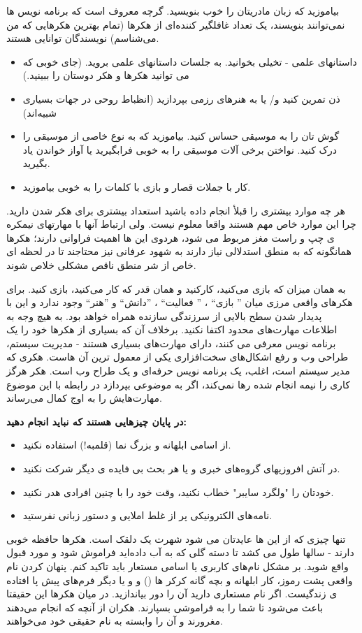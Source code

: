 بیاموزید که زبان مادریتان را خوب بنویسید. گرچه معروف است که برنامه نویس ها نمی‌توانند بنویسند، یک تعداد غافلگیر کننده‌ای از هکرها (تمام بهترین هکرهایی که من می‌شناسم) نویسندگان توانایی هستند.
\begin{itemize}
\item داستانهای علمی - تخیلی بخوانید. به جلسات داستانهای علمی بروید. (جای خوبی که می توانید هکرها و هکر دوستان را ببینید.)
\item ذن تمرین کنید و/ یا به هنرهای رزمی بپردازید (انظباط روحی در جهات بسیاری شبیه‌اند)
\item گوش تان را به موسیقی حساس کنید. بیاموزید که به نوع خاصی از موسیقی را درک کنید. نواختن برخی آلات موسیقی را به خوبی فرابگیرید یا آواز خواندن یاد بگیرید.
\item کار با جملات قصار و بازی با کلمات را به خوبی بیاموزید.
\end{itemize}
هر چه موارد بیشتری را قبلأ انجام داده باشید استعداد بیشتری برای هکر شدن دارید. چرا این موارد خاص مهم هستند واقعا معلوم نیست. ولی ارتباط آنها با مهارتهای نیمکره ی چپ و راست مغز مربوط می شود، هردوی این ها اهمیت فراوانی دارند؛ هکرها همانگونه که به منطق استدلالی نیاز دارند به شهود عرفانی نیز محتاجند تا در لحظه ای خاص از شر منطق ناقص مشکلی خلاص شوند.

به همان میزان که بازی می‌کنید، کارکنید و همان قدر که کار می‌کنید، بازی کنید. برای هکر‌های واقعی مرزی میان ” بازی“ ، ” فعالیت“ ، ”دانش“ و ”هنر“ وجود ندارد و این با پدیدار شدن سطح بالایی از سرزندگی سازنده همراه خواهد بود. به هیچ وجه به اطلاعات مهارت‌های محدود اکتفا نکنید. برخلاف آن که بسیاری از هکرها خود را یک برنامه نویس معرفی می کنند، دارای مهارت‌های بسیاری هستند - مدیریت سیستم، طراحی وب و رفع اشکال‌های سخت‌افزاری 
یکی از معمول ترین آن هاست. هکری که مدیر سیستم است، اغلب، یک برنامه نویس حرفه‌ای و یک طراح وب است. هکر هرگز کاری را نیمه انجام شده رها نمی‌کند، اگر به موضوعی بپردازد در رابطه با این موضوع مهارت‌هایش را به اوج کمال می‌رساند.

\textbf{در پایان چیزهایی هستند که نباید انجام دهید:}
\begin{itemize}
	\item از اسامی ابلهانه و بزرگ نما (قلمبه!) استفاده نکنید.
	\item در آتش افروزیهای گروه‌های خبری و یا هر بحث بی فایده ی دیگر شرکت نکنید.
	\item خودتان را "ولگرد سایبر" خطاب نکنید، وقت خود را با چنین افرادی هدر نکنید.
	\item نامه‌های الکترونیکی پر از غلط املایی و دستور زبانی نفرستید.
\end{itemize}
تنها چیزی که از این ها عایدتان می شود شهرت یک دلقک است. هکرها حافظه خوبی دارند - سالها طول می کشد تا دسته گلی که به آب داده‌اید فراموش شود و مورد قبول واقع شوید.
بر مشکل نام‌های کاربری یا اسامی مستعار باید تاکید کنم. پنهان کردن نام واقعی پشت رموز، کار ابلهانه و بچه گانه کرکر ها
() و 
و یا دیگر فرم‌های پیش پا افتاده ی زندگیست. اگر نام مستعاری دارید آن را دور بیاندازید. در میان هکرها این حقیقتا باعث می‌شود تا شما را به فراموشی بسپارند. هکران از آنچه که انجام می‌دهند مغرورند و آن را وابسته به نام حقیقی خود می‌خواهند.

